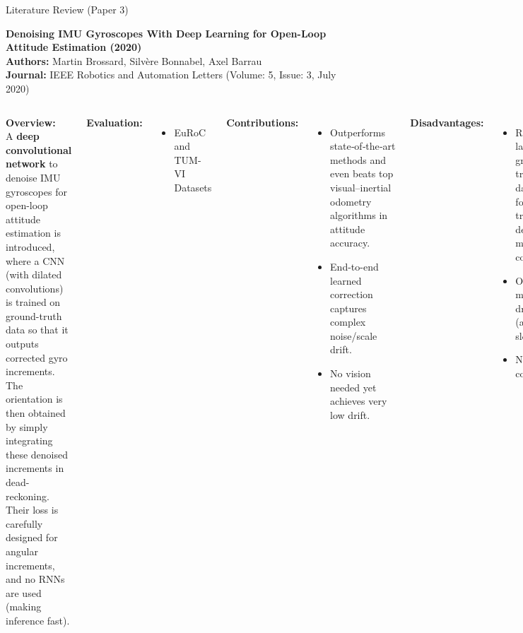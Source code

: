 \documentclass[aspectratio=169,xcolor=dvipsnames]{beamer}
\begin{document}

\begin{frame}{Literature Review (Paper 3)}

\textbf{Denoising IMU Gyroscopes With Deep Learning for Open-Loop Attitude Estimation (2020)} \hfill \textcolor{blue}{\cite{brossard2020openloopCNN}}\\
\textbf{Authors:} Martin Brossard, Silvère Bonnabel, Axel Barrau \\
\textbf{Journal:} IEEE Robotics and Automation Letters (Volume: 5, Issue: 3, July 2020)

\vspace{1em}
\scriptsize
\begin{columns}
    \textbf{Overview:}\\
    A \textbf{deep convolutional network} to denoise IMU gyroscopes for open-loop attitude estimation is introduced, where a CNN (with dilated convolutions) is trained on ground-truth data so that it outputs corrected gyro increments. The orientation is then obtained by simply integrating these denoised increments in dead-reckoning. Their loss is carefully designed for angular increments, and no RNNs are used (making inference fast). 

    \vspace{0.5em}
    \textbf{Evaluation:}
    \begin{itemize}
        \item EuRoC and TUM-VI Datasets
    \end{itemize}

    \textbf{Contributions:}
    \begin{itemize}
        \item  Outperforms state‑of‑the‑art methods and even beats top visual–inertial odometry algorithms in attitude accuracy. 
        \item End-to-end learned correction captures complex noise/scale drift. 
        \item No vision needed yet achieves very low drift.
    \end{itemize}

    \vspace{0.5em}
    \textbf{Disadvantages:}
    \begin{itemize}
        \item Requires large ground-truth datasets for training design is more complex.
        \item Open-loop mode still drifts (albeit slower).
        \item Network complexity. 
    \end{itemize}
\end{columns}

\end{frame}
\end{document}
